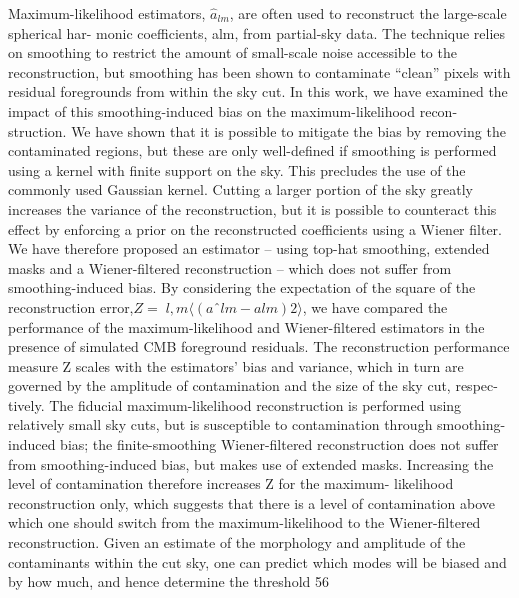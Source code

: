 \documentclass[a4paper, 11pt]{article}
\begin{document}
Maximum-likelihood estimators, $\hat{a}_{lm}$, are often used to reconstruct the large-scale spherical har- monic coefficients, alm, from partial-sky data. The technique relies on smoothing to restrict the amount of small-scale noise accessible to the reconstruction, but smoothing has been shown to contaminate “clean” pixels with residual foregrounds from within the sky cut. In this work, we have examined the impact of this smoothing-induced bias on the maximum-likelihood recon- struction. We have shown that it is possible to mitigate the bias by removing the contaminated regions, but these are only well-defined if smoothing is performed using a kernel with finite support on the sky. This precludes the use of the commonly used Gaussian kernel. Cutting a larger portion of the sky greatly increases the variance of the reconstruction, but it is possible to counteract this effect by enforcing a prior on the reconstructed coefficients using a Wiener filter. We have therefore proposed an estimator – using top-hat smoothing, extended masks and a Wiener-filtered reconstruction – which does not suffer from smoothing-induced bias. By considering the expectation of the square of the reconstruction error,$ Z = 􏰙l, m⟨(aˆlm − alm)2⟩$, we have compared the performance of the maximum-likelihood and Wiener-filtered estimators in the presence of simulated CMB foreground residuals.
The reconstruction performance measure Z scales with the estimators’ bias and variance, which in turn are governed by the amplitude of contamination and the size of the sky cut, respec- tively. The fiducial maximum-likelihood reconstruction is performed using relatively small sky cuts, but is susceptible to contamination through smoothing-induced bias; the finite-smoothing Wiener-filtered reconstruction does not suffer from smoothing-induced bias, but makes use of extended masks. Increasing the level of contamination therefore increases Z for the maximum- likelihood reconstruction only, which suggests that there is a level of contamination above which one should switch from the maximum-likelihood to the Wiener-filtered reconstruction.
Given an estimate of the morphology and amplitude of the contaminants within the cut sky, one can predict which modes will be biased and by how much, and hence determine the threshold
56
\end{document}
